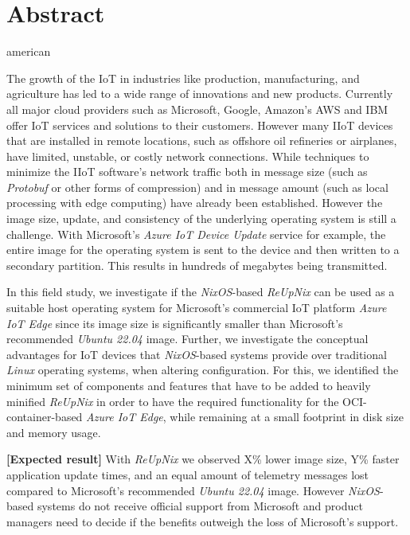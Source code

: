 \chapter*{Abstract}
\begin{otherlanguage*}{american}

The growth of the \ac{IoT} in industries like production, manufacturing, and agriculture has led to a
wide range of innovations and new products. Currently all major cloud providers such as Microsoft, Google,
Amazon's AWS and IBM offer \ac{IoT} services and solutions to their customers.
However many \ac{IIoT} devices that are installed in remote locations, such as offshore oil
refineries or airplanes, have limited, unstable, or costly network connections. While techniques to minimize the \ac{IIoT} software’s
network traffic both in message size (such as \textit{Protobuf} or other forms of compression) and in
message amount (such as local processing with edge computing) have already been established. However the image size,
update, and consistency of the underlying operating system is still a challenge. With Microsoft's \textit{Azure IoT Device
Update} service for example, the entire image for the operating system is sent to the device and then
written to a secondary partition. This results in hundreds of megabytes being transmitted.

In this field study, we investigate if the \textit{NixOS}-based \textit{ReUpNix} can be used as a suitable host operating
system for Microsoft’s commercial \ac{IoT} platform \textit{Azure IoT Edge} since its image size is significantly smaller
than Microsoft's recommended \textit{Ubuntu 22.04} image. Further, we investigate the conceptual advantages for \ac{IoT}
devices that \textit{NixOS}-based systems provide over traditional \textit{Linux} operating systems, when altering configuration.
For this, we identified the minimum set
of components and features that have to be added to heavily minified \textit{ReUpNix} in order to have the required
functionality
for the OCI-container-based \textit{Azure IoT Edge}, while remaining at a small footprint in disk size and memory
usage.

\textbf{[Expected result]}
With \textit{ReUpNix} we observed X\% lower image size, Y\% faster application update times, and
an equal amount of telemetry messages lost compared to Microsoft’s recommended \textit{Ubuntu 22.04}
image. However \textit{NixOS}-based systems do not receive official support from Microsoft and product
managers need to
decide if the benefits outweigh the loss of Microsoft's support.



\end{otherlanguage*}
